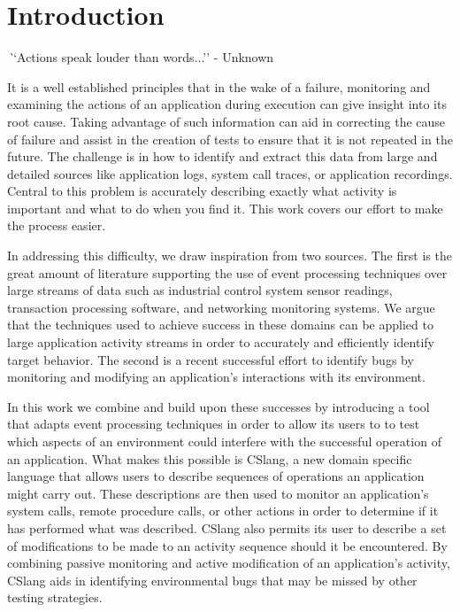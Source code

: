 \section{Introduction}
\label{SEC:introduction}


{\textit ``Actions speak louder than words...'' - Unknown}

It is a well established principles
that in the wake of a failure,
monitoring and examining the actions
of an application
during execution can give insight
into its root cause.
Taking advantage of such information
can aid in correcting
the cause of failure
and assist in the creation
of tests to ensure that it
is not repeated in the future.
The challenge is in
how to identify and extract this data
from large and detailed sources like application logs,
system call traces,
or application recordings.
Central to this problem
is accurately describing exactly what activity is important
and what to do when you find it.
This work covers our effort to make the process easier.

In addressing this difficulty,
we draw inspiration from two sources.
The first is the great amount of literature supporting the use of event
processing techniques over large streams of data such as
industrial control system sensor readings,
transaction processing software,
and networking monitoring systems.
We argue that the techniques used
to achieve success
in these domains
can be applied
to large application activity streams in order to accurately
and efficiently identify target behavior.
The second is a recent successful effort
to identify bugs by monitoring
and modifying an application's interactions with its environment.

In this work
we combine and build upon these successes
by introducing a tool
that adapts event processing techniques
in order to allow its users to
to test which aspects of an environment
could interfere with
the successful operation of an application.
What makes this possible is CSlang,
a new domain specific language
that allows users
to describe sequences of operations
an application might carry out.
These descriptions are then used
to monitor an application's system calls,
remote procedure calls,
or other actions in order to determine if it has
performed what was described.
CSlang also permits
its user to describe a set of modifications
to be made to an activity sequence should it be encountered.
By combining passive monitoring and active modification
of an application's activity,
CSlang aids in identifying environmental bugs
that may be missed by other testing strategies.

